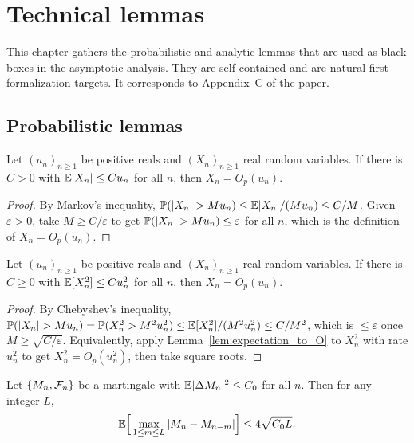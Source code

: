 \chapter{Technical lemmas}
\label{chap:technical}

This chapter gathers the probabilistic and analytic lemmas that are used as
black boxes in the asymptotic analysis. They are self-contained and are natural
first formalization targets. It corresponds to Appendix~C of the paper.

\section{Probabilistic lemmas}
\label{sec:tech_prob}

\begin{lemma}\label{lem:expectation_to_O}
\leanok
{}
Let $(u_n)_{n\ge1}$ be positive reals and $(X_n)_{n\ge1}$ real random variables.
If there is $C > 0$ with $\mathbb{E}|X_n| \le C u_n$ for all $n$, then $X_n = O_p(u_n)$.
\end{lemma}

\begin{proof}\leanok
By Markov's inequality, $\mathbb{P}(|X_n| > M u_n) \le \mathbb{E}|X_n|/(M u_n) \le C/M$.
Given $\varepsilon > 0$, take $M \ge C/\varepsilon$ to get
$\mathbb{P}(|X_n| > M u_n) \le \varepsilon$ for all $n$, which is the definition of
$X_n = O_p(u_n)$.
\end{proof}

\begin{lemma}\label{lem:sq_expectation_to_O}
\leanok
{}
Let $(u_n)_{n\ge1}$ be positive reals and $(X_n)_{n\ge1}$ real random variables.
If there is $C \ge 0$ with $\mathbb{E}[X_n^2] \le C u_n^2$ for all $n$, then $X_n = O_p(u_n)$.
\end{lemma}

\begin{proof}\leanok
{}
By Chebyshev's inequality, $\mathbb{P}(|X_n| > M u_n) = \mathbb{P}(X_n^2 > M^2 u_n^2)
\le \mathbb{E}[X_n^2]/(M^2 u_n^2) \le C/M^2$, which is $\le \varepsilon$ once
$M \ge \sqrt{C/\varepsilon}$. Equivalently, apply Lemma~\ref{lem:expectation_to_O}
to $X_n^2$ with rate $u_n^2$ to get $X_n^2 = O_p(u_n^2)$, then take square roots.
\end{proof}

\begin{lemma}\label{lem:mart_maximal}
\leanok
Let $\{M_n, \mathcal{F}_n\}$ be a martingale with $\mathbb{E}|\Delta M_n|^2 \le C_0$ for all
$n$. Then for any integer $L$,
\[
  \mathbb{E}\Big[\max_{1 \le m \le L} |M_n - M_{n-m}|\Big] \le 4\sqrt{C_0 L}.
\]
\end{lemma}


